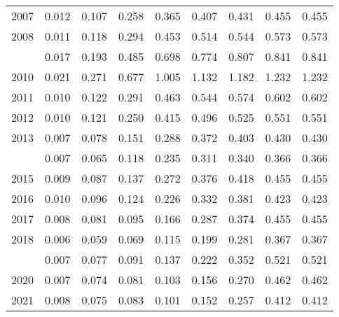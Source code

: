 \documentclass[
]{article}
\begin{document}
\begin{longtable}[t]{lrrrrrrrr}
2007 & 0.012 & 0.107 & 0.258 & 0.365 & 0.407 & 0.431 & 0.455 & 0.455\\
2008 & 0.011 & 0.118 & 0.294 & 0.453 & 0.514 & 0.544 & 0.573 & 0.573\\
\addlinespace
2009 & 0.017 & 0.193 & 0.485 & 0.698 & 0.774 & 0.807 & 0.841 & 0.841\\
2010 & 0.021 & 0.271 & 0.677 & 1.005 & 1.132 & 1.182 & 1.232 & 1.232\\
2011 & 0.010 & 0.122 & 0.291 & 0.463 & 0.544 & 0.574 & 0.602 & 0.602\\
2012 & 0.010 & 0.121 & 0.250 & 0.415 & 0.496 & 0.525 & 0.551 & 0.551\\
2013 & 0.007 & 0.078 & 0.151 & 0.288 & 0.372 & 0.403 & 0.430 & 0.430\\
\addlinespace
2014 & 0.007 & 0.065 & 0.118 & 0.235 & 0.311 & 0.340 & 0.366 & 0.366\\
2015 & 0.009 & 0.087 & 0.137 & 0.272 & 0.376 & 0.418 & 0.455 & 0.455\\
2016 & 0.010 & 0.096 & 0.124 & 0.226 & 0.332 & 0.381 & 0.423 & 0.423\\
2017 & 0.008 & 0.081 & 0.095 & 0.166 & 0.287 & 0.374 & 0.455 & 0.455\\
2018 & 0.006 & 0.059 & 0.069 & 0.115 & 0.199 & 0.281 & 0.367 & 0.367\\
\addlinespace
2019 & 0.007 & 0.077 & 0.091 & 0.137 & 0.222 & 0.352 & 0.521 & 0.521\\
2020 & 0.007 & 0.074 & 0.081 & 0.103 & 0.156 & 0.270 & 0.462 & 0.462\\
2021 & 0.008 & 0.075 & 0.083 & 0.101 & 0.152 & 0.257 & 0.412 & 0.412\\*
\end{longtable}
\end{document}
